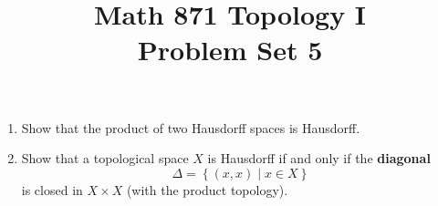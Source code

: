 \documentclass[12pt]{article}
\title{Math 871 Topology I\\[-0.1em]
\large Problem Set 5}
\author{}
\date{}
\theoremstyle{definition}
\begin{document}
\maketitle


	
\thispagestyle{fancy}
\pagestyle{fancy}




\begin{enumerate}[roomy]


\item Show that the product of two Hausdorff spaces is Hausdorff.


\item Show that a topological space $X$ is Hausdorff if and only if the {\bf diagonal}
\[ \Delta = \left\lbrace (x,x) \mid x \in X \right\rbrace\]
is closed in $X \times X$ (with the product topology).


\end{enumerate}
\end{document}
